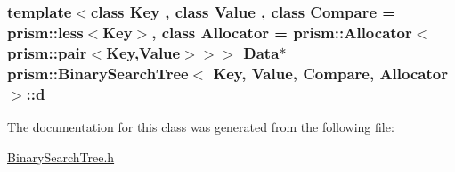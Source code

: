 \subsubsection[{\texorpdfstring{d}{d}}]{\setlength{\rightskip}{0pt plus 5cm}template$<$class Key , class Value , class Compare  = prism\+::less$<$\+Key$>$, class Allocator  = prism\+::\+Allocator$<$prism\+::pair$<$\+Key,\+Value$>$$>$$>$ {\bf Data}$\ast$ {\bf prism\+::\+Binary\+Search\+Tree}$<$ Key, Value, Compare, {\bf Allocator} $>$\+::d}\hypertarget{classprism_1_1_binary_search_tree_a6d5900a993bfceb52af558fa5de72bcd}{}\label{classprism_1_1_binary_search_tree_a6d5900a993bfceb52af558fa5de72bcd}


The documentation for this class was generated from the following file\+:\begin{DoxyCompactItemize}
\item 
\hyperlink{_binary_search_tree_8h}{Binary\+Search\+Tree.\+h}\end{DoxyCompactItemize}
